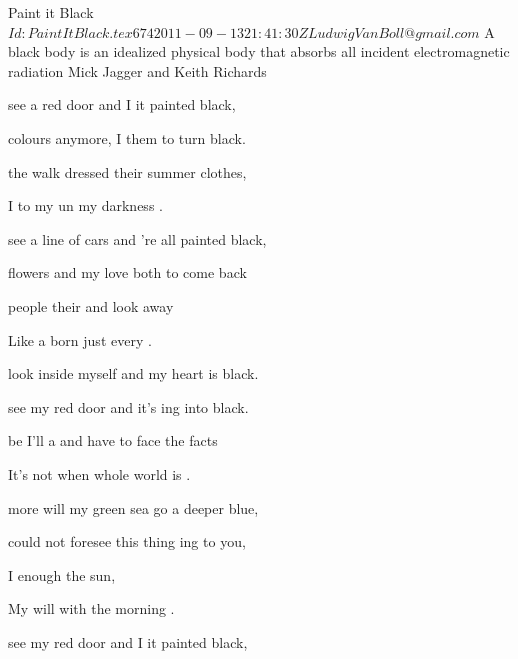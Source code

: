 \begin{SBSong}{Paint it Black}
  {$Id: PaintItBlack.tex 674 2011-09-13 21:41:30Z LudwigVanBoll@gmail.com $}
  {A black body is an idealized physical body that absorbs all incident electromagnetic radiation}
  {Mick Jagger and Keith Richards}
    \begin{SBVerse}
     see a red door and I  it painted black,
    
     colours anymore, I  them to turn black.
    
      the  walk  dressed  their summer clothes,
    
    I  to  my  un my darkness .
  \end{SBVerse}
  \begin{SBVerse}
     see a line of cars and 're all painted black,
    
     flowers and my love both  to come back
    
      people  their  and  look away
    
    Like a  born   just  every .
  \end{SBVerse}
  \begin{SBVerse}
     look inside myself and  my heart is black.
    
     see my red door and it's ing into black.
    
    be  I'll  a and  have to face the facts
    
    It's not    when  whole world is .
  \end{SBVerse}
  \begin{SBVerse}
     more will my green sea go  a deeper blue,
    
     could not foresee this thing ing to you,
    
     I   enough  the  sun,
    
    My  will  with   the morning .
  \end{SBVerse}
  \begin{SBVerse}
     see my red door and I  it painted black,
    

\end{SBVerse}
\end{SBSong}
